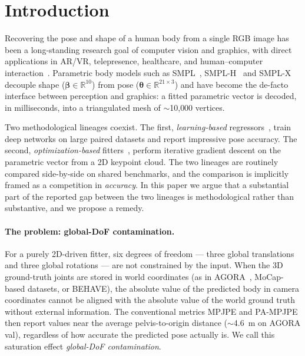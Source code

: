 \documentclass[twocolumn,10pt]{svjour3}
\begin{document}

\section{Introduction}
\label{sec:intro}

Recovering the pose and shape of a human body from a single RGB image has been a long-standing research goal of computer vision and graphics, with direct applications in AR/VR, telepresence, healthcare, and human--computer interaction~\cite{SMPLX,SMPL_simplify,HMR}. Parametric body models such as SMPL~\cite{SMPL}, SMPL-H~\cite{SMPLH} and SMPL-X~\cite{SMPLX} decouple shape ($\boldsymbol{\beta}\!\in\!\mathbb{R}^{10}$) from pose ($\boldsymbol{\theta}\!\in\!\mathbb{R}^{21\times 3}$) and have become the de-facto interface between perception and graphics: a fitted parametric vector is decoded, in milliseconds, into a triangulated mesh of $\sim$10{,}000 vertices.

Two methodological lineages coexist. The first, \emph{learning-based} regressors~\cite{HMR,SPIN,ExPose,PIXIE}, train deep networks on large paired datasets and report impressive pose accuracy. The second, \emph{optimization-based} fitters~\cite{SMPLifyX,SMPL_simplify}, perform iterative gradient descent on the parametric vector from a 2D keypoint cloud. The two lineages are routinely compared side-by-side on shared benchmarks, and the comparison is implicitly framed as a competition in \emph{accuracy}. In this paper we argue that a substantial part of the reported gap between the two lineages is methodological rather than substantive, and we propose a remedy.

\paragraph{The problem: global-DoF contamination.}
For a purely 2D-driven fitter, six degrees of freedom --- three global translations and three global rotations --- are not constrained by the input. When the 3D ground-truth joints are stored in world coordinates (as in AGORA~\cite{AGORA}, MoCap-based datasets, or BEHAVE), the absolute value of the predicted body in camera coordinates cannot be aligned with the absolute value of the world ground truth without external information. The conventional metrics MPJPE and PA-MPJPE then report values near the average pelvis-to-origin distance ($\sim$4.6~m on AGORA val), regardless of how accurate the predicted pose actually is. We call this saturation effect \emph{global-DoF contamination}.
\end{document}
